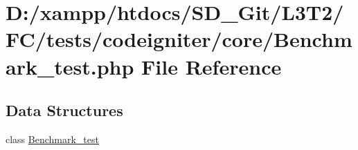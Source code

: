 \hypertarget{_benchmark__test_8php}{}\section{D\+:/xampp/htdocs/\+S\+D\+\_\+\+Git/\+L3\+T2/\+F\+C/tests/codeigniter/core/\+Benchmark\+\_\+test.php File Reference}
\label{_benchmark__test_8php}
\subsection*{Data Structures}
\begin{DoxyCompactItemize}
\item 
class \hyperlink{class_benchmark__test}{Benchmark\+\_\+test}
\end{DoxyCompactItemize}
